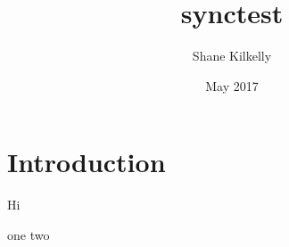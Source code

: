 \documentclass{article}
\title{synctest}
\author{Shane Kilkelly}
\date{May 2017}
\begin{document}
\maketitle

\section{Introduction}


Hi

one
two
\end{document}
